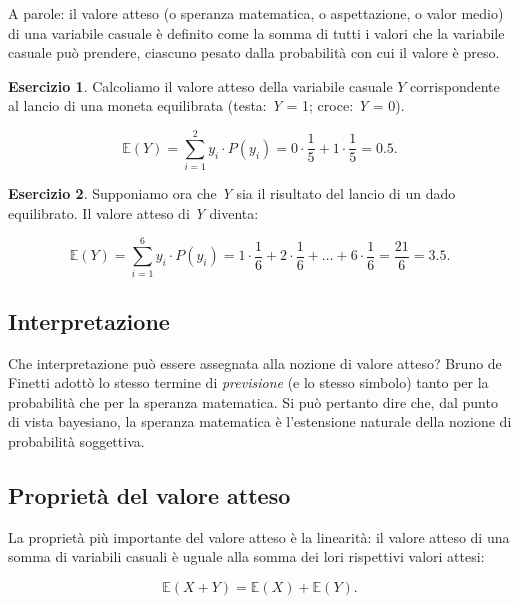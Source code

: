 \documentclass[
  11pt,
]{krantz}
\newcommand{\E}{\mathbb{E}} %
\theoremstyle{definition}
\theoremstyle{definition}
\theoremstyle{definition}
\newtheorem{exercise}{Esercizio}[chapter]
\theoremstyle{definition}
\theoremstyle{remark}
\begin{document}
A parole: il valore atteso (o speranza matematica, o aspettazione, o valor medio) di una variabile casuale è definito come la somma di tutti i valori che la variabile casuale può prendere, ciascuno pesato dalla probabilità con cui il valore è preso.

\begin{exercise}
Calcoliamo il valore atteso della variabile casuale \(Y\) corrispondente al lancio di una moneta equilibrata (testa: \emph{Y} = 1; croce: \emph{Y} = 0).

\[
\E(Y) = \sum_{i=1}^{2} y_i \cdot P(y_i) = 0 \cdot \frac{1}{5} + 1 \cdot \frac{1}{5} = 0.5.
\]
\end{exercise}

\begin{exercise}
Supponiamo ora che \emph{Y} sia il risultato del lancio di un dado equilibrato. Il valore atteso di \emph{Y} diventa:

\[
\E(Y) = \sum_{i=1}^{6} y_i \cdot P(y_i) = 1 \cdot \frac{1}{6} + 2 \cdot \frac{1}{6} + \dots + 6 \cdot \frac{1}{6} = \frac{21}{6} = 3.5.
\]
\end{exercise}

\hypertarget{interpretazione}{%
\subsection{Interpretazione}\label{interpretazione}}

Che interpretazione può essere assegnata alla nozione di valore atteso? Bruno de Finetti adottò lo stesso termine di \emph{previsione} (e lo stesso simbolo) tanto per la probabilità che per la speranza matematica. Si può pertanto dire che, dal punto di vista bayesiano, la speranza matematica è l'estensione naturale della nozione di probabilità soggettiva.

\hypertarget{proprietuxe0-del-valore-atteso}{%
\subsection{Proprietà del valore atteso}\label{proprietuxe0-del-valore-atteso}}

La proprietà più importante del valore atteso è la linearità: il valore atteso di una somma di variabili casuali è uguale alla somma dei lori rispettivi valori attesi:

\begin{equation}
\E(X + Y) = \E(X) + \E(Y).
\label{eq:prop-expval-linearity}
\end{equation}
\end{document}
